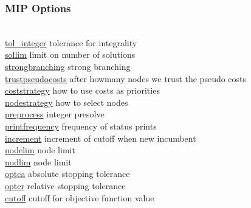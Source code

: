 \subsubsection{MIP Options}
\begin{tabbing}
\hspace {1.3in} \= \\
\hyperlink{tol_integer}
{tol\_integer} \> tolerance for integrality \\
\hyperlink{sollim}
{sollim} \> limit on number of solutions \\
\hyperlink{strongbranching}
{strongbranching} \> strong branching \\
\hyperlink{trustpseudocosts}
{trustpseudocosts} \> after howmany nodes we trust the pseudo costs \\
\hyperlink{coststrategy}
{coststrategy} \> how to use costs as priorities \\
\hyperlink{nodestrategy}
{nodestrategy} \> how to select nodes \\
\hyperlink{preprocess}
{preprocess} \> integer presolve \\
\hyperlink{printfrequency}
{printfrequency} \> frequency of status prints \\
\hyperlink{increment}
{increment} \> increment of cutoff when new incumbent \\
\hyperlink{nodelim}
{nodelim} \> node limit \\
\hyperlink{nodlim}
{nodlim} \> node limit \\
\hyperlink{optca}
{optca} \> absolute stopping tolerance \\
\hyperlink{optcr}
{optcr} \> relative stopping tolerance \\
\hyperlink{cutoff}
{cutoff} \> cutoff for objective function value
\end{tabbing}


